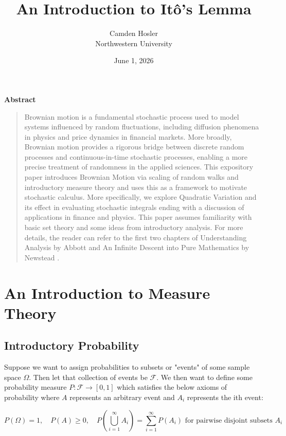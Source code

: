 \documentclass[12pt]{article}
\makeatletter
\theoremstyle{definition}
\theoremstyle{plain}
\theoremstyle{remark}
\renewcommand{\maketitle}{
  \begin{center}
    {\Large\bfseries\@title\par}
    \vspace{0.5em}
    {\normalsize\@author\par}
    {\normalsize\@date\par}
  \end{center}
  \vspace{0.5em}
}
\renewenvironment{abstract}{
  \begin{center}
    \textbf{Abstract}
  \end{center}
  \begin{quotation}\small
}{
  \end{quotation}
}
\makeatother
\begin{document}
\title{An Introduction to It\^{o}'s Lemma}
\author{Camden Hosler\\Northwestern University}
\date{June 1, 2026}

\maketitle

\begin{abstract}
  Brownian motion is a fundamental stochastic process used to model systems influenced by random fluctuations, including diffusion phenomena in physics and price dynamics in financial markets.  More broadly, Brownian motion provides a rigorous bridge between discrete random processes and continuous-in-time stochastic processes, enabling a more precise treatment of randomness in the applied sciences.  This expository paper introduces Brownian Motion via scaling of random walks and introductory measure theory and uses this as a framework to motivate stochastic calculus.  More specifically, we explore Quadratic Variation and its effect in evaluating stochastic integrals ending with a discussion of applications in finance and physics.  This paper assumes familiarity with basic set theory and some ideas from introductory analysis.  For more details, the reader can refer to the first two chapters of Understanding Analysis by Abbott and An Infinite Descent into Pure Mathematics by Newstead \cite{Abbott, InfiniteDescent}. 
\end{abstract}

\tableofcontents

\section{An Introduction to Measure Theory}

\subsection{Introductory Probability}
Suppose we want to assign probabilities to subsets or "events" of some sample space $\Omega$.  Then let that collection of events be $\mathcal{F}$.  We then want to define some probability measure $P: \mathcal{F} \to [0,1]$ which satisfies the below axioms of probability where $A$ represents an arbitrary event and $A_i$ represents the ith event:

\[
    P(\Omega) =1, \quad P(A) \geq 0, \quad P \left( \bigcup_{i=1}^\infty A_i \right) = \sum_{i=1}^\infty P(A_i)  \text{ for pairwise disjoint subsets $A_i$}
\]
\end{document}
